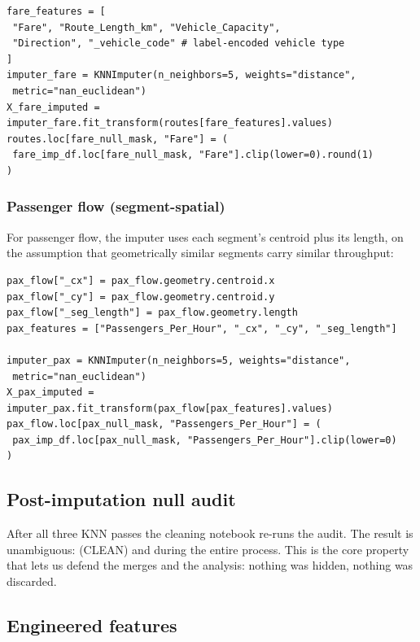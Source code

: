 \begin{lstlisting}[caption={KNN imputation on Routes Fare, five attribute features.}]
fare_features = [
 "Fare", "Route_Length_km", "Vehicle_Capacity",
 "Direction", "_vehicle_code" # label-encoded vehicle type
]
imputer_fare = KNNImputer(n_neighbors=5, weights="distance",
 metric="nan_euclidean")
X_fare_imputed = imputer_fare.fit_transform(routes[fare_features].values)
routes.loc[fare_null_mask, "Fare"] = (
 fare_imp_df.loc[fare_null_mask, "Fare"].clip(lower=0).round(1)
)
\end{lstlisting}

\subsubsection{Passenger flow (segment-spatial)}

For passenger flow, the imputer uses each segment's centroid plus its
length, on the assumption that geometrically similar segments carry
similar throughput:

\begin{lstlisting}[caption={KNN imputation on Passenger Flow, centroid + length.}]
pax_flow["_cx"] = pax_flow.geometry.centroid.x
pax_flow["_cy"] = pax_flow.geometry.centroid.y
pax_flow["_seg_length"] = pax_flow.geometry.length
pax_features = ["Passengers_Per_Hour", "_cx", "_cy", "_seg_length"]

imputer_pax = KNNImputer(n_neighbors=5, weights="distance",
 metric="nan_euclidean")
X_pax_imputed = imputer_pax.fit_transform(pax_flow[pax_features].values)
pax_flow.loc[pax_null_mask, "Passengers_Per_Hour"] = (
 pax_imp_df.loc[pax_null_mask, "Passengers_Per_Hour"].clip(lower=0)
)
\end{lstlisting}

\subsection{Post-imputation null audit}

After all three KNN passes the cleaning notebook re-runs the audit. The
result is unambiguous:  (CLEAN) and  during the entire
process. This is the core property that lets us defend the merges and
the analysis: nothing was hidden, nothing was discarded.

\subsection{Engineered features}

